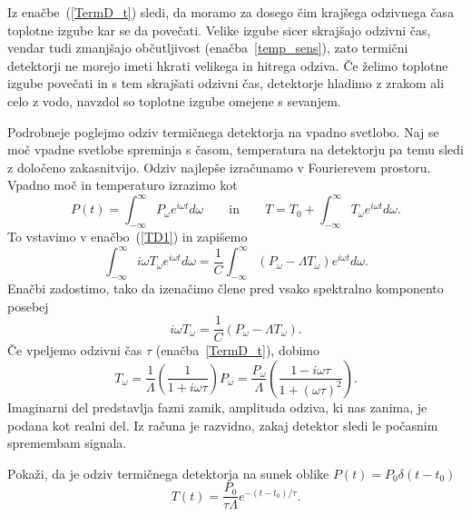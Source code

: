 Iz enačbe~(\ref{TermD_t}) sledi, da moramo za dosego čim krajšega odzivnega časa toplotne izgube 
kar se da povečati. Velike izgube sicer skrajšajo odzivni čas, 
vendar tudi zmanjšajo občutljivost (enačba~\ref{temp_sens}), 
zato termični detektorji ne morejo imeti hkrati velikega in hitrega odziva. 
Če želimo toplotne izgube povečati in s tem skrajšati odzivni čas, detektorje hladimo z zrakom 
ali celo z vodo, navzdol so toplotne izgube omejene s sevanjem.  

Podrobneje poglejmo odziv termičnega detektorja na vpadno svetlobo. Naj se  moč vpadne svetlobe
spreminja s časom, temperatura na detektorju pa temu sledi z določeno zakasnitvijo. Odziv
najlepše izračunamo v Fourierevem prostoru. Vpadno moč in temperaturo izrazimo kot
\begin{equation}
P(t) = \int_{-\infty}^{\infty} P_\omega e^{i\omega t}d\omega \qquad \mathrm{in} \qquad
T = T_0 + \int_{-\infty}^{\infty} T_\omega e^{i\omega t}d\omega.
\label{TermTF}
\end{equation}
To vstavimo v enačbo~(\ref{TD1}) in zapišemo
\begin{equation}
\int_{-\infty}^{\infty} i \omega T_\omega e^{i\omega t}d\omega = \frac{1}{C}
\int_{-\infty}^{\infty} (P_\omega - \Lambda T_\omega) e^{i\omega t}d\omega.
\end{equation}
Enačbi zadostimo, tako da izenačimo člene pred vsako spektralno komponento posebej
\begin{equation}
i \omega T_\omega = \frac{1}{C}\left(P_\omega - \Lambda T_\omega\right).
\end{equation}
Če vpeljemo odzivni čas $\tau$ (enačba~\ref{TermD_t}), dobimo
\begin{equation}
T_\omega = \frac{1}{\Lambda}\left(\frac{1}{1+i \omega \tau}\right)P_\omega = 
\frac{P_\omega}{\Lambda}\left(\frac{1-i \omega \tau}{1+(\omega \tau)^2}\right).
\label{TermOdziv}
\end{equation}
Imaginarni del predstavlja fazni zamik, amplituda odziva, ki nas zanima, je 
podana kot realni del. Iz računa je razvidno, zakaj detektor sledi le 
počasnim spremembam signala. 
\begin{definition}
Pokaži, da je odziv termičnega detektorja na sunek oblike $P(t) = P_0\delta(t-t_0)$
\begin{equation}
T(t)=\frac{P_0}{\tau\Lambda}e^{-(t-t_0)/\tau}.
\end{equation}
\end{definition}

